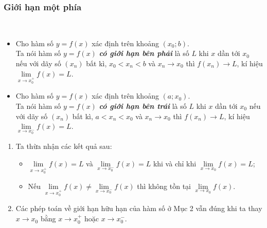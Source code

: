 \begin{tomtat}
	\subsubsection{Giới hạn một phía}
	\begin{dn}
		\
		\begin{itemize}
			\item Cho hàm số $ y=f(x) $ xác định trên khoảng $ (x_0;b) $.\\
			Ta nói hàm số $ y=f(x) $ \textbf{\textit{có giới hạn bên phải}} là số $ L $ khi $ x $ dần tới $ x_0 $ nếu với dãy số $ (x_n) $ bất kì, $ x_0<x_n<b $ và $ x_n\to x_0 $ thì $ f(x_n)\to L $, kí hiệu $ \lim \limits_{x \to x_0^+} f(x) =L$.
			\item Cho hàm số $ y=f(x) $ xác định trên khoảng $ (a;x_0) $.\\
			Ta nói hàm số $ y=f(x) $ \textbf{\textit{có giới hạn bên trái}} là số $ L $ khi $ x $ dần tới $ x_0 $ nếu với dãy số $ (x_n) $ bất kì, $ a<x_n<x_0 $ và $ x_n\to x_0 $ thì $ f(x_n)\to L $, kí hiệu $ \lim \limits_{x \to x_0^-} f(x) =L$.
		\end{itemize}
	\end{dn}
	\begin{note} 
		\begin{enumerate}
			\item Ta thừa nhận các kết quả sau:
			\begin{itemize}
				\item $ \lim \limits_{x \to x_0^+} f(x)=L$ và $ \lim \limits_{x \to x_0^-} f(x)=L $ khi và chỉ khi $ \lim \limits_{x \to x_0} f(x) =L$;
				\item Nếu $ \lim \limits_{x \to x_0^+} f(x)\neq \lim \limits_{x \to x_0^-} f(x)$ thì không tồn tại $ \lim \limits_{x \to x_0} f(x) $.
			\end{itemize}
			\item Các phép toán về giới hạn hữu hạn của hàm số ở Mục 2 vẫn đúng khi ta thay $ x\to x_0 $ bằng $ x\to x_0^+ $ hoặc $ x\to x_0^- $.
		\end{enumerate}
	\end{note}
	

\end{tomtat}
